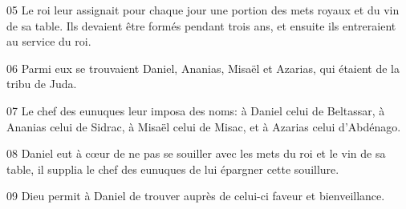 
05 Le roi leur assignait pour chaque jour une portion des mets royaux et du vin de sa table. Ils devaient être formés pendant trois ans, et ensuite ils entreraient au service du roi.

06 Parmi eux se trouvaient Daniel, Ananias, Misaël et Azarias, qui étaient de la tribu de Juda.

07 Le chef des eunuques leur imposa des noms: à Daniel celui de Beltassar, à Ananias celui de Sidrac, à Misaël celui de Misac, et à Azarias celui d’Abdénago.

08 Daniel eut à cœur de ne pas se souiller avec les mets du roi et le vin de sa table, il supplia le chef des eunuques de lui épargner cette souillure.

09 Dieu permit à Daniel de trouver auprès de celui-ci faveur et bienveillance.
